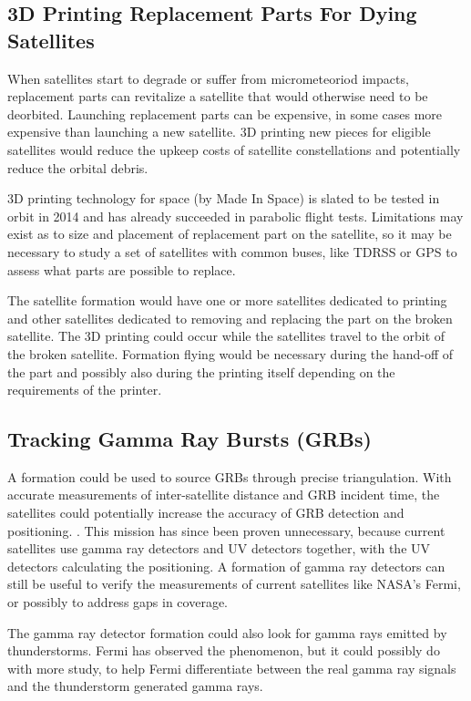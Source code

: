 \subsection{3D Printing Replacement Parts For Dying Satellites}
\label{3d}

When satellites start to degrade or suffer from micrometeoriod impacts, replacement parts can revitalize a satellite that would otherwise need to be deorbited. Launching replacement parts can be expensive, in some cases more expensive than launching a new satellite. 3D printing new pieces for eligible satellites would reduce the upkeep costs of satellite constellations and potentially reduce the orbital debris.  

3D printing technology for space (by Made In Space) is slated to be tested in orbit in 2014 and has already succeeded in parabolic flight tests. Limitations may exist as to size and placement of replacement part on the satellite, so it may be necessary to study a set of satellites with common buses, like TDRSS or GPS to assess what parts are possible to replace. 

The satellite formation would have one or more satellites dedicated to printing and other satellites dedicated to removing and replacing the part on the broken satellite. The 3D printing could occur while the satellites travel to the orbit of the broken satellite. Formation flying would be necessary during the hand-off of the part and possibly also during the printing itself depending on the requirements of the printer. 

\subsection{Tracking Gamma Ray Bursts (GRBs)}
\label{grb}
A formation could be used to source GRBs through precise triangulation. With accurate measurements of inter-satellite distance and GRB incident time, the satellites could potentially increase the accuracy of GRB detection and positioning. \cite{Ref:Dill}. This mission has since been proven unnecessary, because current satellites use gamma ray detectors and UV detectors together, with the UV detectors calculating the positioning. A formation of gamma ray detectors can still be useful to verify the measurements of current satellites like NASA's Fermi, or possibly to address gaps in coverage. 

The gamma ray detector formation could also look for gamma rays emitted by thunderstorms. Fermi has observed the phenomenon, but it could possibly do with more study, to help Fermi differentiate between the real gamma ray signals and the thunderstorm generated gamma rays.\cite{Ref:Fermi} \cite{Ref:Kitts}

